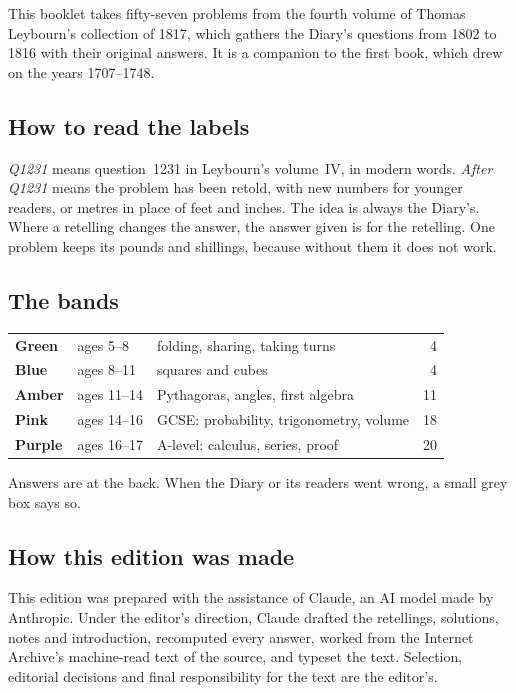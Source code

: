 \documentclass[11pt,a4paper]{article}
\newcounter{prob}
\begin{document}
This booklet takes fifty-seven problems from the fourth volume of Thomas Leybourn's
collection of 1817, which gathers the Diary's questions from 1802 to 1816 with their
original answers. It is a companion to the first book, which drew on the years
1707--1748.

\subsection*{How to read the labels}

\textit{Q1231} means question~1231 in Leybourn's volume~IV, in modern words.
\textit{After Q1231} means the problem has been retold, with new numbers for younger
readers, or metres in place of feet and inches. The idea is always the Diary's. Where a
retelling changes the answer, the answer given is for the retelling. One problem keeps
its pounds and shillings, because without them it does not work.

\subsection*{The bands}

\begin{center}
\begin{tabular}{>{\bfseries}l l l r}
\color{bandgreen}Green  & ages 5--8   & folding, sharing, taking turns       & 4\\
\color{bandblue}Blue    & ages 8--11  & squares and cubes                    & 4\\
\color{bandamber}Amber  & ages 11--14 & Pythagoras, angles, first algebra    & 11\\
\color{bandpink}Pink    & ages 14--16 & GCSE: probability, trigonometry, volume & 18\\
\color{bandpurple}Purple & ages 16--17 & A-level: calculus, series, proof    & 20\\
\end{tabular}
\end{center}

Answers are at the back. When the Diary or its readers went wrong, a small grey box
says so.

\subsection*{How this edition was made}
This edition was prepared with the assistance of Claude, an AI model made by Anthropic. Under the editor's direction, Claude drafted the retellings, solutions, notes and introduction, recomputed every answer, worked from the Internet Archive's machine-read text of the source, and typeset the text. Selection, editorial decisions and final responsibility for the text are the editor's.
\end{document}
